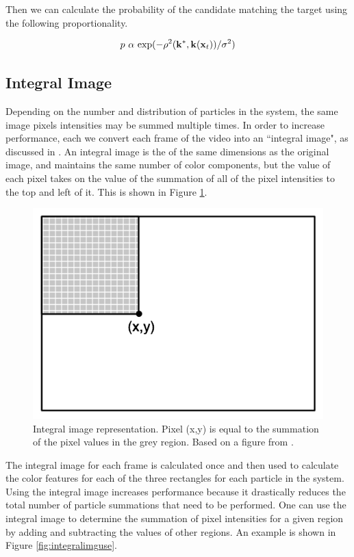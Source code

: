 \documentclass[11pt]{article}
\begin{document}
Then we can calculate the probability of the candidate matching the target using the following proportionality.

\begin{equation}
p \text{ $\alpha$ exp} (-\rho^2({\bf k}^*, {\bf k}({\bf x}_t)) / \sigma^2)
\label{eq:colorprob}
\end{equation}


\subsection{Integral Image}

Depending on the number and distribution of particles in the system, the same image pixels intensities may be summed multiple times. In order to increase performance, each we convert each frame of the video into an ``integral image", as discussed in \cite{facedetection}. An integral image is the of the same dimensions as the original image, and maintains the same number of color components, but the value of each pixel takes on the value of the summation of all of the pixel intensities to the top and left of it. This is shown in Figure \ref{fig:integralimg}.
 
 \begin{figure}[H]
\centering
\includegraphics[scale=.4]{img/IntegralImage.jpg}
\caption{Integral image representation. Pixel (x,y) is equal to the summation of the pixel values in the grey region. Based on a figure from \cite{facedetection}.}
\label{fig:integralimg}
\end{figure}

The integral image for each frame is calculated once and then used to calculate the color features for each of the three rectangles for each particle in the system. Using the integral image increases performance because it drastically reduces the total number of particle summations that need to be performed. One can use the integral image to determine the summation of pixel intensities for a given region by adding and subtracting the values of other regions. An example is shown in Figure \ref{fig:integralimguse}.
\end{document}
